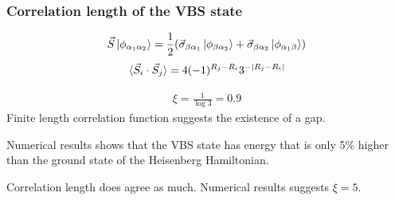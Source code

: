 \documentclass{beamer}
\begin{document}
\begin{frame}
    \frametitle{Correlation length of the VBS state}
    \begin{align*}
        \vec{S}\ket{\phi_{\alpha_1\alpha_2}} = \frac{1}{2}(\vec{\sigma}_{\beta \alpha_1} \ket{\phi_{\beta \alpha_2}} + \vec{\sigma}_{\beta \alpha_2} \ket{\phi_{\alpha_1\beta}} ) 
    \end{align*}
    \begin{align*}
        \braket{\vec{S}_i \cdot \vec{S}_j} = 4 (-1)^{R_j - R_i} 3^{-|R_j - R_i|}
    \end{align*}

    \begin{align*}
        \xi = \frac{1}{\log 3} = 0.9
    \end{align*}
    \pause 
    Finite length correlation function suggests the existence of a gap. 
    \pause 

    Numerical results shows that the VBS state has energy that is only 5\% higher than the ground state of the Heisenberg Hamiltonian. 
    \pause 

    Correlation length does agree as much. Numerical results suggests $\xi = 5$. 
\end{frame}
\end{document}
